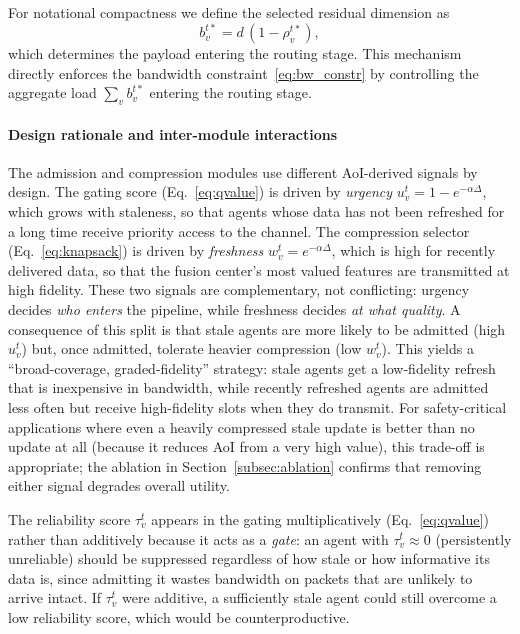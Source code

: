 \documentclass[final,3p,times,review,sort&compress]{elsarticle}
\begin{document}
For notational compactness we define the selected residual dimension as
\begin{equation}
b_v^{t*} = d\,(1-\rho_v^{t*}),
\label{eq:rho_star}
\end{equation}
which determines the payload entering the routing stage. This mechanism directly enforces the bandwidth constraint~\eqref{eq:bw_constr} by controlling the aggregate load $\sum_v b_v^{t*}$ entering the routing stage.

\paragraph{Design rationale and inter-module interactions}
The admission and compression modules use different AoI-derived signals by design. The gating score (Eq.~\ref{eq:qvalue}) is driven by \emph{urgency} $u_v^t = 1 - e^{-\alpha\Delta}$, which grows with staleness, so that agents whose data has not been refreshed for a long time receive priority access to the channel. The compression selector (Eq.~\ref{eq:knapsack}) is driven by \emph{freshness} $w_v^t = e^{-\alpha\Delta}$, which is high for recently delivered data, so that the fusion center's most valued features are transmitted at high fidelity. These two signals are complementary, not conflicting: urgency decides \emph{who enters} the pipeline, while freshness decides \emph{at what quality}. A consequence of this split is that stale agents are more likely to be admitted (high $u_v^t$) but, once admitted, tolerate heavier compression (low $w_v^t$). This yields a ``broad-coverage, graded-fidelity'' strategy: stale agents get a low-fidelity refresh that is inexpensive in bandwidth, while recently refreshed agents are admitted less often but receive high-fidelity slots when they do transmit. For safety-critical applications where even a heavily compressed stale update is better than no update at all (because it reduces AoI from a very high value), this trade-off is appropriate; the ablation in Section~\ref{subsec:ablation} confirms that removing either signal degrades overall utility.

The reliability score $\tau_v^t$ appears in the gating multiplicatively (Eq.~\ref{eq:qvalue}) rather than additively because it acts as a \emph{gate}: an agent with $\tau_v^t \approx 0$ (persistently unreliable) should be suppressed regardless of how stale or how informative its data is, since admitting it wastes bandwidth on packets that are unlikely to arrive intact. If $\tau_v^t$ were additive, a sufficiently stale agent could still overcome a low reliability score, which would be counterproductive.
\end{document}
